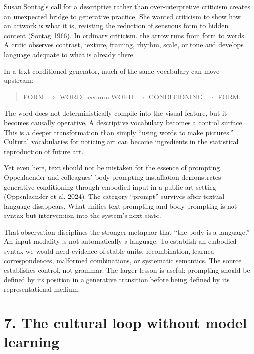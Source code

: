 \documentclass[
  11pt,
  letterpaper,
]{article}
\begin{document}
Susan Sontag's call for a descriptive rather than over-interpretive
criticism creates an unexpected bridge to generative practice. She
wanted criticism to show how an artwork is what it is, resisting the
reduction of sensuous form to hidden content (Sontag 1966). In ordinary
criticism, the arrow runs from form to words. A critic observes
contrast, texture, framing, rhythm, scale, or tone and develops language
adequate to what is already there.

In a text-conditioned generator, much of the same vocabulary can move
upstream:

\begin{quote}
FORM $\rightarrow$ WORD \hspace{1cm} becomes \hspace{1cm} WORD $\rightarrow$ CONDITIONING $\rightarrow$ FORM.
\end{quote}

The word does not deterministically compile into the visual feature, but
it becomes causally operative. A descriptive vocabulary becomes a
control surface. This is a deeper transformation than simply ``using
words to make pictures.'' Cultural vocabularies for noticing art can
become ingredients in the statistical reproduction of future art.

Yet even here, text should not be mistaken for the essence of prompting.
Oppenlaender and colleagues' body-prompting installation demonstrates
generative conditioning through embodied input in a public art setting
(Oppenlaender et al. 2024). The category ``prompt'' survives after
textual language disappears. What unifies text prompting and body
prompting is not syntax but intervention into the system's next state.

That observation disciplines the stronger metaphor that ``the body is a
language.'' An input modality is not automatically a language. To
establish an embodied syntax we would need evidence of stable units,
recombination, learned correspondences, malformed combinations, or
systematic semantics. The source establishes control, not grammar. The
larger lesson is useful: prompting should be defined by its position in
a generative transition before being defined by its representational
medium.

\section{7. The cultural loop without model
learning}\label{the-cultural-loop-without-model-learning}
\end{document}
